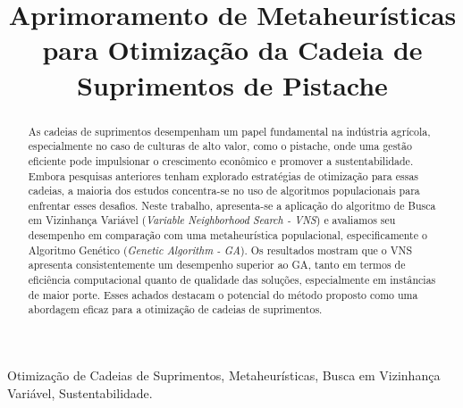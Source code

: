\documentclass[conference]{IEEEtran}
\begin{document}
\def\portugues{1}

\title{Aprimoramento de Metaheurísticas para Otimização da Cadeia de Suprimentos de Pistache}

\author{
\and
{}
}

\maketitle

\begin{abstract}
    As cadeias de suprimentos desempenham um papel fundamental na indústria agrícola, especialmente no caso de culturas de alto valor, como o pistache, onde uma gestão 
    eficiente pode impulsionar o crescimento econômico e promover a sustentabilidade. Embora pesquisas anteriores tenham explorado estratégias de otimização para essas 
    cadeias, a maioria dos estudos concentra-se no uso de algoritmos populacionais para enfrentar esses desafios. Neste trabalho, apresenta-se a aplicação do algoritmo de 
    Busca em Vizinhança Variável (\textit{Variable Neighborhood Search - VNS}) e avaliamos seu desempenho em comparação com uma metaheurística populacional, especificamente 
    o Algoritmo Genético (\textit{Genetic Algorithm - GA}). Os resultados mostram que o VNS apresenta consistentemente um desempenho superior ao GA, tanto em termos de 
    eficiência computacional quanto de qualidade das soluções, especialmente em instâncias de maior porte. Esses achados destacam o potencial do método proposto como uma 
    abordagem eficaz para a otimização de cadeias de suprimentos.
\end{abstract}


\begin{IEEEkeywords}
    Otimização de Cadeias de Suprimentos, Metaheurísticas, Busca em Vizinhança Variável, Sustentabilidade.
\end{IEEEkeywords}
\end{document}
